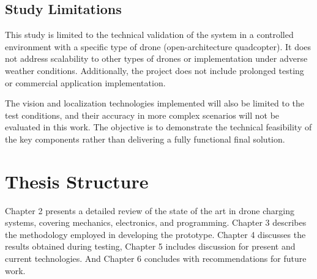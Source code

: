 \subsection{Study Limitations}

This study is limited to the technical validation of the system in a controlled environment with a specific type of drone (open-architecture quadcopter). It does not address scalability to other types of drones or implementation under adverse weather conditions. Additionally, the project does not include prolonged testing or commercial application implementation.

The vision and localization technologies implemented will also be limited to the test conditions, and their accuracy in more complex scenarios will not be evaluated in this work. The objective is to demonstrate the technical feasibility of the key components rather than delivering a fully functional final solution.

\section{Thesis Structure}

Chapter 2  presents a detailed review of the state of the art in drone charging systems, covering mechanics, electronics, and programming. Chapter 3 describes the methodology employed in developing the prototype. Chapter 4 discusses the results obtained during testing, Chapter 5 includes discussion for present and current technologies. And Chapter 6 concludes with recommendations for future work.
